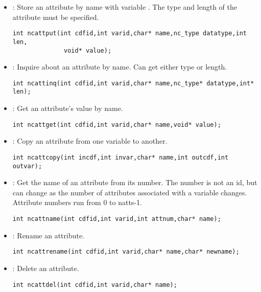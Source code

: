 \documentclass{article}
\begin{document}
\begin{itemize}

\item {} : Store an attribute by name with variable .
The type and 
length of the attribute must be specified.
\begin{verbatim}
int ncattput(int cdfid,int varid,char* name,nc_type datatype,int len,
              void* value);
\end{verbatim}

\item {} : Inquire about an attribute by name. Can get either
type or length. 
\begin{verbatim}
int ncattinq(int cdfid,int varid,char* name,nc_type* datatype,int* len);
\end{verbatim}

\item {} : Get an attribute's value by name. 
\begin{verbatim}
int ncattget(int cdfid,int varid,char* name,void* value);
\end{verbatim}

\item {} : Copy an attribute from one variable to another. 
\begin{verbatim}
int ncattcopy(int incdf,int invar,char* name,int outcdf,int outvar);
\end{verbatim}

\item {} : Get the name of an attribute from its number. The
number is not an id, 
but can change as the number of attributes associated with a variable
changes. Attribute numbers run from 0 to natts-1.
\begin{verbatim}
int ncattname(int cdfid,int varid,int attnum,char* name);
\end{verbatim}

\item {} : Rename an attribute. 
\begin{verbatim}
int ncattrename(int cdfid,int varid,char* name,char* newname);
\end{verbatim}

\item {} : Delete an attribute. 
\begin{verbatim}
int ncattdel(int cdfid,int varid,char* name);
\end{verbatim}

\end{itemize}
\end{document}
